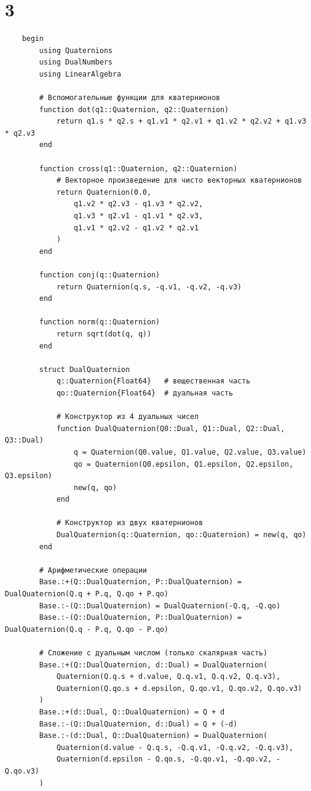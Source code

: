 \chapter{3}

\begin{verbatim}
    begin
        using Quaternions
        using DualNumbers
        using LinearAlgebra

        # Вспомогательные функции для кватернионов
        function dot(q1::Quaternion, q2::Quaternion)
            return q1.s * q2.s + q1.v1 * q2.v1 + q1.v2 * q2.v2 + q1.v3 * q2.v3
        end

        function cross(q1::Quaternion, q2::Quaternion)
            # Векторное произведение для чисто векторных кватернионов
            return Quaternion(0.0,
                q1.v2 * q2.v3 - q1.v3 * q2.v2,
                q1.v3 * q2.v1 - q1.v1 * q2.v3,
                q1.v1 * q2.v2 - q1.v2 * q2.v1
            )
        end

        function conj(q::Quaternion)
            return Quaternion(q.s, -q.v1, -q.v2, -q.v3)
        end

        function norm(q::Quaternion)
            return sqrt(dot(q, q))
        end

        struct DualQuaternion
            q::Quaternion{Float64}   # вещественная часть
            qo::Quaternion{Float64}  # дуальная часть

            # Конструктор из 4 дуальных чисел
            function DualQuaternion(Q0::Dual, Q1::Dual, Q2::Dual, Q3::Dual)
                q = Quaternion(Q0.value, Q1.value, Q2.value, Q3.value)
                qo = Quaternion(Q0.epsilon, Q1.epsilon, Q2.epsilon, Q3.epsilon)
                new(q, qo)
            end

            # Конструктор из двух кватернионов
            DualQuaternion(q::Quaternion, qo::Quaternion) = new(q, qo)
        end

        # Арифметические операции
        Base.:+(Q::DualQuaternion, P::DualQuaternion) = DualQuaternion(Q.q + P.q, Q.qo + P.qo)
        Base.:-(Q::DualQuaternion) = DualQuaternion(-Q.q, -Q.qo)
        Base.:-(Q::DualQuaternion, P::DualQuaternion) = DualQuaternion(Q.q - P.q, Q.qo - P.qo)

        # Сложение с дуальным числом (только скалярная часть)
        Base.:+(Q::DualQuaternion, d::Dual) = DualQuaternion(
            Quaternion(Q.q.s + d.value, Q.q.v1, Q.q.v2, Q.q.v3),
            Quaternion(Q.qo.s + d.epsilon, Q.qo.v1, Q.qo.v2, Q.qo.v3)
        )
        Base.:+(d::Dual, Q::DualQuaternion) = Q + d
        Base.:-(Q::DualQuaternion, d::Dual) = Q + (-d)
        Base.:-(d::Dual, Q::DualQuaternion) = DualQuaternion(
            Quaternion(d.value - Q.q.s, -Q.q.v1, -Q.q.v2, -Q.q.v3),
            Quaternion(d.epsilon - Q.qo.s, -Q.qo.v1, -Q.qo.v2, -Q.qo.v3)
        )


\end{verbatim}
